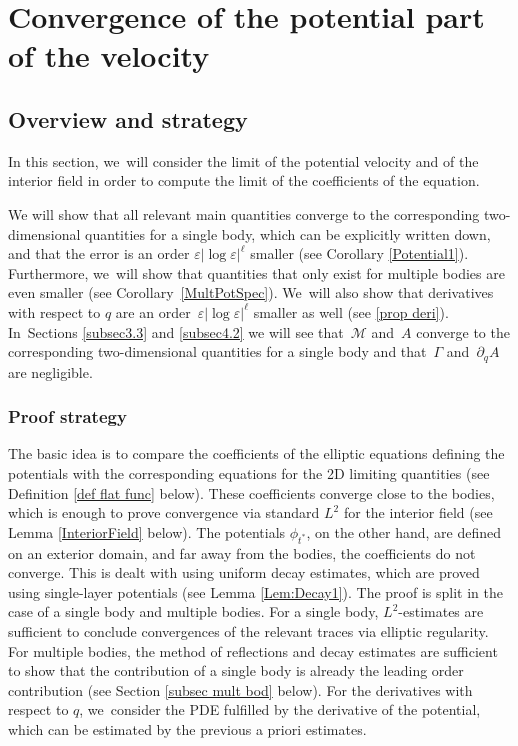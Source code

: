 \documentclass[JEP,XML,SOM,Unicode,published]{cedram}
\let\epsilon\varepsilon
\theoremstyle{definition}
\let\de\partial
\let\eps\epsilon
\begin{document}
\section{Convergence of the potential part of the velocity}\label{Section3}

\subsection{Overview and strategy}

In this section, we~will consider the limit of the potential velocity and of the interior field in order to compute the limit of the coefficients of the equation.

We will show that all relevant main quantities converge to the corresponding two-dimensional quantities for a single body, which can be explicitly written down, and that the error is an order $\eps|{\log\eps}|^\ell$ smaller (see Corollary \ref{Potential1}). Furthermore, we~will show that quantities that only exist for multiple bodies are even smaller (see Corollary~\ref{MultPotSpec}). We~will also show that derivatives with respect to $q$ are an order~$\eps|{\log\eps}|^\ell$ smaller as well (see \ref{prop deri}). In~Sections \ref{subsec3.3} and \ref{subsec4.2} we will see that~$\mathcal{M}$ and~$A$ converge to the corresponding two-dimensional quantities for a single body and that~$\Gamma$ and~$\de_q A$ are negligible.

\subsubsection{Proof strategy}
The basic idea is to compare the coefficients of the elliptic equations defining the potentials with the corresponding equations for the 2D limiting quantities (see \eg Definition \ref{def flat func} below). These coefficients converge close to the bodies, which is enough to prove convergence via standard $L^2$ for the interior field (see Lemma \ref{InteriorField} below). The potentials $\phi_{t^*}$, on the other hand, are defined on an exterior domain, and far away from the bodies, the coefficients do not converge. This is dealt with using uniform decay estimates, which are proved using single-layer potentials (see Lemma \ref{Lem:Decay1}). The proof is split in the case of a single body and multiple bodies. For a single body, $L^2$-estimates are sufficient to conclude convergences of the relevant traces via elliptic regularity. For multiple bodies, the method of reflections and decay estimates are sufficient to show that the contribution of a single body is already the leading order contribution (see Section \ref{subsec mult bod} below). For the derivatives with respect to $q$, we~consider the PDE fulfilled by the derivative of the potential, which can be estimated by the previous a priori estimates.
\end{document}
